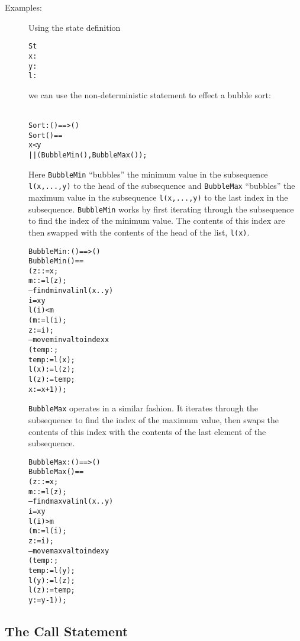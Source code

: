 \documentclass[\pformat,12pt]{article}
\begin{document}
\begin{description}
\item[Examples:] Using the 
state definition
  \begin{alltt}
   St 
    x:
    y:
    l:
  \end{alltt}
  we can use the non-deterministic statement to effect a bubble sort:
  \begin{alltt}\label{sortDef}
  Sort: () ==> ()
  Sort () ==
     x < y 
      ||(BubbleMin(), BubbleMax());
  \end{alltt}
  Here \texttt{BubbleMin} ``bubbles'' the minimum value in the
  subsequence \texttt{l(x,...,y)} to the head of the subsequence and
  \texttt{BubbleMax} ``bubbles'' the maximum value in the subsequence
  \texttt{l(x,...,y)} to the last index in the
  subsequence. \texttt{BubbleMin} works by first iterating through the
  subsequence to find the index of the minimum value. The contents of
  this index are then swapped with the contents of the head of the
  list, \texttt{l(x)}.
  \begin{alltt}
  BubbleMin : () ==> ()
  BubbleMin () ==
    ( z: := x;
      m: := l(z);
     -- find min val in l(x..y)
      i = x  y 
        l(i) < m
        ( m := l(i);
              z := i);
     -- move min val to index x
     ( temp:;
      temp := l(x);
      l(x) := l(z);
      l(z) := temp;
      x := x+1));
\end{alltt}
\texttt{BubbleMax} operates in a similar fashion. It iterates through the
  subsequence to find the index of the maximum value, then swaps the
  contents of this index with the contents of the last element of the
  subsequence. 
\begin{alltt}
  BubbleMax : () ==> ()
  BubbleMax () ==
    ( z: := x;
      m: := l(z);
     -- find max val in l(x..y)
      i = x  y 
        l(i) > m
        ( m := l(i);
              z := i);
     -- move max val to index y
     ( temp:;
      temp := l(y);
      l(y) := l(z);
      l(z) := temp;
      y := y-1));
  \end{alltt}
\end{description}

\subsection{The Call Statement}
\label{call-stmt}
\end{document}
